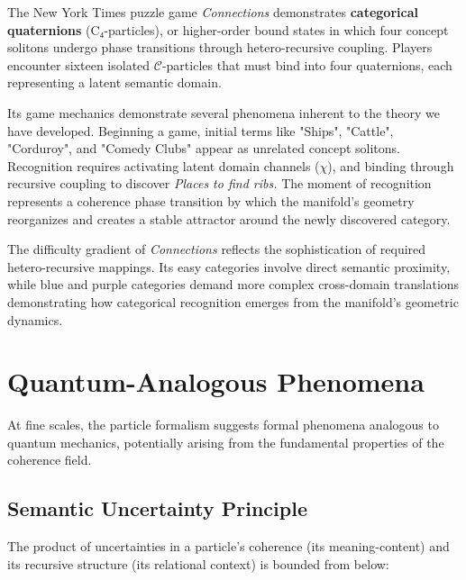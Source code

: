 The New York Times puzzle game \textit{Connections} demonstrates \textbf{categorical quaternions} (C₄-particles), or higher-order bound states in which four concept solitons undergo phase transitions through hetero-recursive coupling. Players encounter sixteen isolated \(\mathcal{C}\)-particles that must bind into four quaternions, each representing a latent semantic domain.

Its game mechanics demonstrate several phenomena inherent to the theory we have developed. Beginning a game, initial terms like "Ships", "Cattle", "Corduroy", and "Comedy Clubs" appear as unrelated concept solitons. Recognition requires activating latent domain channels (\(\chi\)), and binding through recursive coupling to discover \textit{Places to find ribs.} The moment of recognition represents a coherence phase transition by which the manifold's geometry reorganizes and creates a stable attractor around the newly discovered category. 

The difficulty gradient of \textit{Connections} reflects the sophistication of required hetero-recursive mappings. Its easy categories involve direct semantic proximity, while blue and purple categories demand more complex cross-domain translations demonstrating how categorical recognition emerges from the manifold's geometric dynamics.


\section{Quantum-Analogous Phenomena}
\label{13.7:quantum_analogous_phenomena}

At fine scales, the particle formalism suggests formal phenomena analogous to quantum mechanics, potentially arising from the fundamental properties of the coherence field.


\subsection{Semantic Uncertainty Principle}
\label{13.7.1:semantic_uncertainty_principle}

The product of uncertainties in a particle's coherence (its meaning-content) and its recursive structure (its relational context) is bounded from below:

